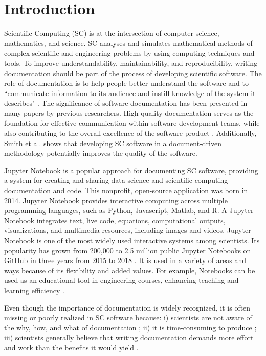\chapter{Introduction} \label{chap:intro}
Scientific Computing (SC) is at the intersection of computer science, 
mathematics, and science. SC analyses and simulates mathematical methods of 
complex scientific and engineering problems by using computing techniques and 
tools. To improve understandability, maintainability, and reproducibility, 
writing documentation should be part of the process of developing scientific 
software. The role of documentation is to help people better understand the 
software and to ``communicate information to its audience and instill knowledge 
of the system it describes" \cite{forward2002software}. The significance of 
software documentation has been presented in many papers by previous 
researchers. High-quality documentation serves as the foundation for effective 
communication within software development teams, while also contributing to the 
overall excellence of the software product \cite{parnas2011precise, 
chomal2014significance, kipyegen2013importance}. Additionally, Smith et al. 
\cite{SmithandKoothoor2016, SmithandYu2007} shows that developing SC software 
in a document-driven methodology potentially improves the quality of the 
software. 

Jupyter Notebook is a popular approach for documenting SC software, providing a 
system for creating and sharing data science and scientific computing 
documentation and code. This nonprofit, open-source application was born in 
2014. Jupyter Notebook provides interactive computing across multiple 
programming languages, such as Python, Javascript, Matlab, and R. A Jupyter 
Notebook integrates text, live code, equations, computational outputs, 
visualizations, and multimedia resources, including images and videos. Jupyter 
Notebook is one of the most widely used interactive systems among scientists. 
Its popularity has grown from 200,000 to 2.5 million public Jupyter Notebooks 
on GitHub in three years from 2015 to 2018 \cite{Jeffrey2018}. It is used in a 
variety of areas and ways because of its flexibility and added values. For 
example, Notebooks can be used as an educational tool in engineering courses, 
enhancing teaching and learning efficiency \cite{cardoso2019using, zhao2019use}.

Even though the importance of documentation is widely recognized, it is often 
missing or poorly realized in SC software because: i) scientists are not aware 
of the why, how, and what of documentation \cite{hermann2022documenting, 
chang2022understanding}; ii) it is time-consuming to produce 
\cite{sanders2008dealing}; iii) scientists generally believe that writing 
documentation demands more effort and work than the benefits it would yield 
\cite{smith2016advantages}.

